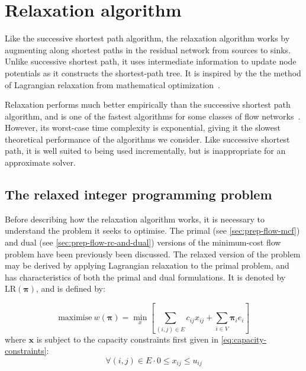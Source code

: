\section{Relaxation algorithm} \label{sec:impl-relax}


Like the successive shortest path algorithm, the relaxation algorithm works by augmenting along shortest paths in the residual network from sources to sinks. Unlike successive shortest path, it uses intermediate information to update node potentials as it constructs the shortest-path tree. It is inspired by the the method of Lagrangian relaxation from mathematical optimization~\cite[ch.~16]{Ahuja:1993}\cite{Fisher:1981}.

Relaxation performs much better empirically than the successive shortest path algorithm, and is one of the fastest algorithms for some classes of flow networks~\cite{KiralyKovacs:2012}. However, its worst-case time complexity is exponential, giving it the slowest theoretical performance of the algorithms we consider\footnotemark. Like successive shortest path, it is well suited to being used incrementally, but is inappropriate for an approximate solver.

\subsection{The relaxed integer programming problem}
Before describing how the relaxation algorithm works, it is necessary to understand the problem it seeks to optimise. The primal (see \cref{sec:prep-flow-mcf}) and dual (see \cref{sec:prep-flow-rc-and-dual}) versions of the minimum-cost flow problem have been previously been discussed. The relaxed version of the problem may be derived by applying Lagrangian relaxation to the primal problem, and has characteristics of both the primal and dual formulations. It is denoted by $\mathrm{LR}(\boldsymbol{\pi})$, and is defined by:

\begin{equation} \label{eq:relax-obj-fun-excess}
\mathrm{maximise}\: w\left(\boldsymbol{\pi}\right)=\min_{x}\left[\sum_{\left(i,j\right)\in E}c_{ij}x_{ij}+\sum_{i\in V}\boldsymbol{\pi}_{i}e_{i}\right]
\end{equation}
where $\mathbf{x}$ is subject to the capacity constraints first given in \cref{eq:capacity-constraints}:
\[\forall\left(i,j\right)\in E\cdot 0\leq x_{ij}\leq u_{ij}\]

